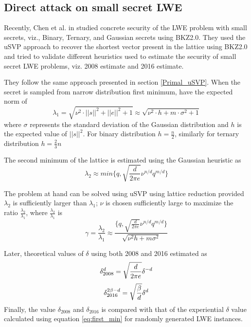 \subsection{Direct attack on small secret LWE} Recently, Chen et al. in \cite{chen2020concrete} studied concrete security of the LWE problem with small secrets, viz., Binary, Ternary, and Gaussian secrets using BKZ2.0. They used the uSVP approach to recover the shortest vector present in the lattice using BKZ2.0 and tried to validate different heuristics used to estimate the security of small secret LWE problems, viz. 2008 estimate and 2016 estimate.



They follow the same approach presented in section \ref{Primal_uSVP}. When the secret is sampled from narrow distribution first minimum, have the expected norm of
\begin{equation}
    \lambda_1=\sqrt{\nu^2 \cdot ||s||^2+||e||^2+1} \approx \sqrt{\nu^2 \cdot h+m \cdot \sigma^2+1}
    \label{eq:shortest_vec1}
\end{equation}
where $\sigma$ represents the standard deviation of the Gaussian distribution and $h$ is the expected value of $||s||^2$. For binary distribution $h=\frac{n}{2}$, similarly for ternary distribution $h=\frac{2}{3}n$

The second minimum of the lattice is estimated using the Gaussian heuristic as
\begin{equation}
    \lambda_2 \approx min
    \Big\{ q,\sqrt{\frac{d}{2\pi e}} \nu^{n/d} q^{m/d} \Big\}
\end{equation}




The problem at hand can be solved using uSVP using lattice reduction provided $\lambda_2$ is sufficiently larger than $\lambda_1$; $\nu$ is chosen sufficiently large to maximize the ratio $\frac{\lambda_2}{\lambda_1}$, where $\frac{\lambda_2}{\lambda_1}$ is
\begin{equation}
    \gamma=\frac{\lambda_2}{\lambda_1} \approx \frac{\Big\{ q,\sqrt{\frac{d}{2\pi e}} \nu^{n/d} q^{m/d} \Big\}}{\sqrt{\nu^2 h +m \sigma^2}}
\end{equation}

Later, theoretical values of $\delta$ using both 2008 and 2016 estimated as
\begin{equation}
    \delta^d_{2008}=\sqrt{\frac{d}{2 \pi e}} \delta^{-d} \\
\end{equation}
\begin{equation}
    \delta^{2\beta-d}_{2016}=\sqrt{\frac{\beta}{d}} \delta^{d} \\
\end{equation}
Finally, the value $\delta_{2008}$ and $\delta_{2016}$ is compared with that of the experiential $\delta$ value calculated using equation \ref{eq:first_min} for randomly generated LWE instances.






